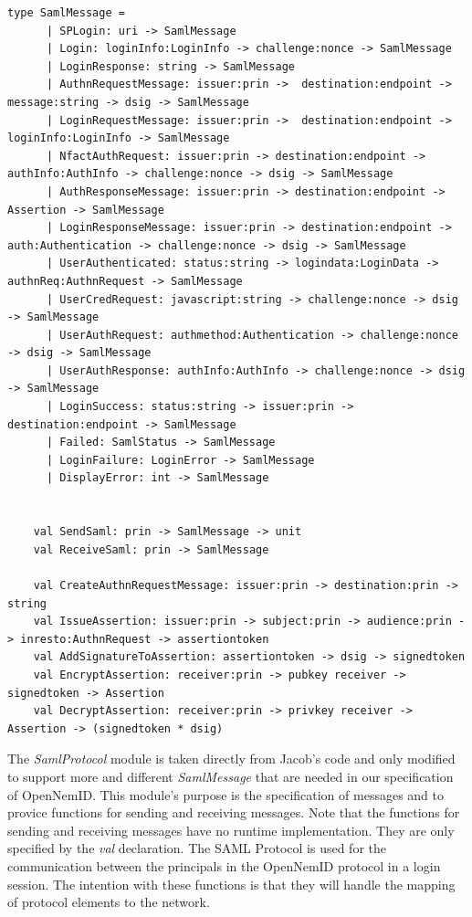 \documentclass[twosided]{report}
\begin{document}
\begin{lstlisting}[style=fstar, caption={Specification of the SAML Protocol elements}]
	type SamlMessage =
	  | SPLogin: uri -> SamlMessage
	  | Login: loginInfo:LoginInfo -> challenge:nonce -> SamlMessage
	  | LoginResponse: string -> SamlMessage
	  | AuthnRequestMessage: issuer:prin ->  destination:endpoint -> message:string -> dsig -> SamlMessage
	  | LoginRequestMessage: issuer:prin ->  destination:endpoint -> loginInfo:LoginInfo -> SamlMessage 
	  | NfactAuthRequest: issuer:prin -> destination:endpoint -> authInfo:AuthInfo -> challenge:nonce -> dsig -> SamlMessage
	  | AuthResponseMessage: issuer:prin -> destination:endpoint -> Assertion -> SamlMessage
	  | LoginResponseMessage: issuer:prin -> destination:endpoint -> auth:Authentication -> challenge:nonce -> dsig -> SamlMessage
	  | UserAuthenticated: status:string -> logindata:LoginData -> authnReq:AuthnRequest -> SamlMessage
	  | UserCredRequest: javascript:string -> challenge:nonce -> dsig -> SamlMessage
	  | UserAuthRequest: authmethod:Authentication -> challenge:nonce -> dsig -> SamlMessage
	  | UserAuthResponse: authInfo:AuthInfo -> challenge:nonce -> dsig -> SamlMessage
	  | LoginSuccess: status:string -> issuer:prin -> destination:endpoint -> SamlMessage
	  | Failed: SamlStatus -> SamlMessage
	  | LoginFailure: LoginError -> SamlMessage
	  | DisplayError: int -> SamlMessage


	val SendSaml: prin -> SamlMessage -> unit
	val ReceiveSaml: prin -> SamlMessage 

	val CreateAuthnRequestMessage: issuer:prin -> destination:prin -> string
	val IssueAssertion: issuer:prin -> subject:prin -> audience:prin -> inresto:AuthnRequest -> assertiontoken
	val AddSignatureToAssertion: assertiontoken -> dsig -> signedtoken
	val EncryptAssertion: receiver:prin -> pubkey receiver -> signedtoken -> Assertion
	val DecryptAssertion: receiver:prin -> privkey receiver -> Assertion -> (signedtoken * dsig)
\end{lstlisting}

The \emph{SamlProtocol} module is taken directly from Jacob's code and only modified to support more and different \emph{SamlMessage} that are needed in our specification of OpenNemID. This module's purpose is the specification of messages and to provice functions for sending and receiving messages. Note that the functions for sending and receiving messages have no runtime implementation. They are only specified by the \emph{val} declaration. The SAML Protocol is used for the communication between the principals in the OpenNemID protocol in a login session. The intention with these functions is that they will handle the mapping of protocol elements to the network.
\end{document}
